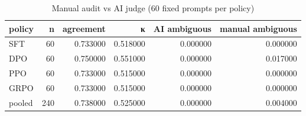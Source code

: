 \begin{table}
\caption{Manual audit vs AI judge (60 fixed prompts per policy)}
\label{tab:t4_manual_audit}
\begin{tabular}{lrrrrr}
\toprule
policy & n & agreement & κ & AI ambiguous & manual ambiguous \\
\midrule
SFT & 60 & 0.733000 & 0.518000 & 0.000000 & 0.000000 \\
DPO & 60 & 0.750000 & 0.551000 & 0.000000 & 0.017000 \\
PPO & 60 & 0.733000 & 0.515000 & 0.000000 & 0.000000 \\
GRPO & 60 & 0.733000 & 0.515000 & 0.000000 & 0.000000 \\
pooled & 240 & 0.738000 & 0.525000 & 0.000000 & 0.004000 \\
\bottomrule
\end{tabular}
\end{table}
